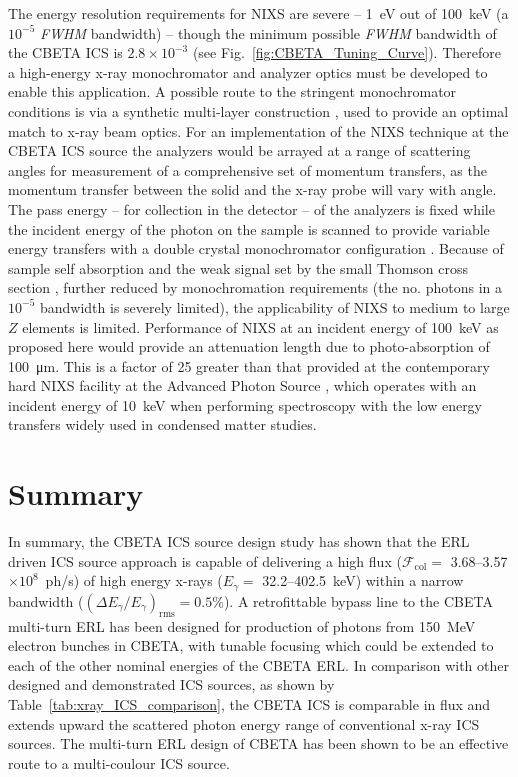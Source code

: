 \documentclass[../main.tex]{subfiles}
\begin{document}
The energy resolution requirements for NIXS are severe -- 1~\si{\electronvolt} out of 100~\si{\kilo\electronvolt} (a $10^{-5}$ \textit{FWHM} bandwidth) -- though the minimum possible \textit{FWHM} bandwidth of the CBETA ICS is $2.8\times 10^{-3}$ (see Fig.~\ref{fig:CBETA_Tuning_Curve}). Therefore a high-energy x-ray monochromator and analyzer optics must be developed to enable this application. A possible route to the stringent monochromator conditions is via a synthetic multi-layer construction \cite{andre2002x}, used to provide an optimal match to x-ray beam optics. For an implementation of the NIXS technique at the CBETA ICS source the analyzers would be arrayed at a range of scattering angles for measurement of a comprehensive set of momentum transfers, as the momentum transfer between the solid and the x-ray probe will vary with angle. The pass energy -- for collection in the detector -- of the analyzers is fixed while the incident energy of the photon on the sample is scanned to provide variable energy transfers with a double crystal monochromator configuration \cite{schulke2007electron,fister2006multielement}. Because of sample self absorption and the weak signal set by the small Thomson cross section \cite{schulke2007electron}, further reduced by monochromation requirements (the no. photons in a $10^{-5}$ bandwidth is severely limited), the applicability of NIXS to medium to large $Z$ elements is limited. Performance of NIXS at an incident energy of 100~\si{\kilo\electronvolt} as proposed here would provide an attenuation length due to photo-absorption of 100~\si{\micro\meter}. This is a factor of 25 greater \cite{TungstenGraph} than that provided at the contemporary hard NIXS facility at the Advanced Photon Source \cite{fister2006multielement}, which operates with an incident energy of 10~\si{\kilo\electronvolt} when performing spectroscopy with the low energy transfers widely used in condensed matter studies.  

\section{Summary}

In summary, the CBETA ICS source design study has shown that the ERL driven ICS source approach is capable of delivering a high flux ($\mathcal{F}_{\mathrm{col}} =$ 3.68--3.57$\times 10^{8}$~ph/\si{\second}) of high energy x-rays ($E_{\gamma} =$ 32.2--402.5~\si{\kilo\electronvolt}) within a narrow bandwidth ($\left(\Delta E_{\gamma}/E_{\gamma}\right)_{\mathrm{rms}} = 0.5$\%). A retrofittable bypass line to the CBETA multi-turn ERL has been designed for production of photons from 150~\si{\mega\electronvolt} electron bunches in CBETA, with tunable focusing which could be extended to each of the other nominal energies of the CBETA ERL. In comparison with other designed and demonstrated ICS sources, as shown by Table~\ref{tab:xray_ICS_comparison}, the CBETA ICS is comparable in flux and extends upward the scattered photon energy range of conventional x-ray ICS sources. The multi-turn ERL design of CBETA has been shown to be an effective route to a multi-coulour ICS source. 
\end{document}
